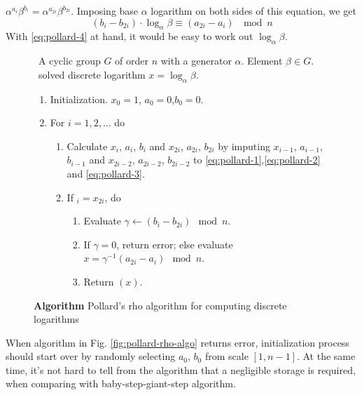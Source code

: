 \documentclass[12pt,journal,compsoc]{IEEEtran}
\begin{document}
$\alpha^{a_{i}}\beta^{b_{i}}=\alpha^{a_{2i}}\beta^{b_{2i}}$. Imposing
base $\alpha$ logarithm on both sides of this equation, we get
\begin{equation}
  \label{eq:pollard-4}
  (b_{i}-b_{2i})\cdot\log_{\alpha}\beta\equiv(a_{2i}-a_{i})~\mod n
\end{equation}
With \autoref{eq:pollard-4} at hand, it would be easy to work
out $\log_{\alpha}\beta$. 
\begin{figure}[!htbp]
  \centering
  \begin{algorithmic}
    \REQUIRE~A cyclic group $G$ of order $n$ with a generator
    $\alpha$. Element $\beta\in G$.  
    \ENSURE~solved discrete logarithm $x=\log_{\alpha}\beta$.
    \begin{enumerate}
    \item Initialization. $x_{0}=1$, $a_{0}=0$,$b_{0}=0$.
    \item For $i=1,2,\ldots$ do
      \begin{enumerate}
      \item Calculate $x_{i}$, $a_{i}$, $b_{i}$ and $x_{2i}$,
        $a_{2i}$, $b_{2i}$ by imputing $x_{i-1}$, $a_{i-1}$, $b_{i-1}$
        and  $x_{2i-2}$, $a_{2i-2}$, $b_{2i-2}$ to
        \autoref{eq:pollard-1},\autoref{eq:pollard-2} and
        \autoref{eq:pollard-3}. 
      \item If $_{i}=x_{2i}$, do
        \begin{enumerate}
        \item Evaluate $\gamma\leftarrow(b_{i}-b_{2i})\mod n$.
        \item If $\gamma=0$, return error; else evaluate
          $x=\gamma^{-1}(a_{2i}-a_{i})\mod n$. 
        \item Return $(x)$.
        \end{enumerate}
      \end{enumerate}
    \end{enumerate}
  \end{algorithmic}
  \caption{\textbf{Algorithm} Pollard's rho algorithm for computing discrete logarithms}
  \label{fig:pollard-rho-algo}
\end{figure}
\par
When algorithm in Fig. \autoref{fig:pollard-rho-algo} returns error,
initialization process should start over by randomly selecting
$a_{0}$, $b_{0}$ from scale $[1,n-1]$. At the same time, it's not hard
to tell from the algorithm that a negligible storage is required, when
comparing with baby-step-giant-step algorithm.
\end{document}
